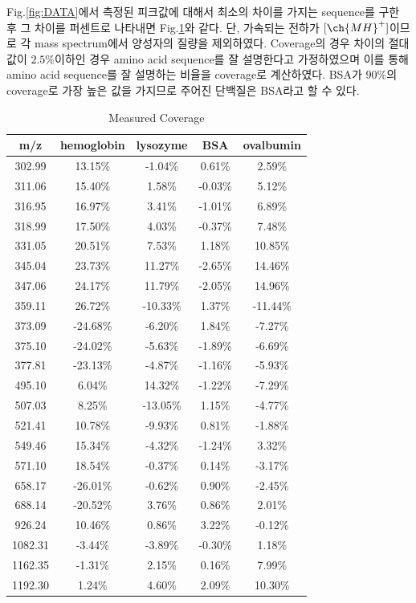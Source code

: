 \documentclass[%
 reprint,
 amsmath,amssymb,
 aps,
]{revtex4-2}
\begin{document}
Fig.\ref{fig:DATA}에서 측정된 피크값에 대해서 최소의 차이를 가지는 sequence를 구한 후 그 차이를 퍼센트로 나타내면 Fig.\ref{tab:cov}와 같다. 단, 가속되는 전하가 $[\ch{MH}^{+}]$이므로 각 mass spectrum에서 양성자의 질량을 제외하였다. Coverage의 경우 차이의 절대값이 $2.5\%$이하인 경우 amino acid sequence를 잘 설명한다고 가정하였으며 이를 통해 amino acid sequence를 잘 설명하는 비율을 coverage로 계산하였다. BSA가 $90\%$의 coverage로 가장 높은 값을 가지므로 주어진 단백질은 BSA라고 할 수 있다.

\begin{table}[]
\caption{\label{tab:cov} Measured Coverage}
\begin{tabular}{c|c|c|c|c} \hline \hline
m/z & hemoglobin & lysozyme & BSA & ovalbumin \\ \hline
302.99 & 13.15\% &-1.04\% &0.61\% &2.59\%\\
311.06 & 15.40\% &1.58\% &-0.03\% &5.12\%\\
316.95 & 16.97\% &3.41\% &-1.01\% &6.89\%\\
318.99 & 17.50\% &4.03\% &-0.37\% &7.48\%\\
331.05 & 20.51\% &7.53\% &1.18\% &10.85\%\\
345.04 & 23.73\% &11.27\% &-2.65\% &14.46\%\\
347.06 & 24.17\% &11.79\% &-2.05\% &14.96\%\\
359.11 & 26.72\% &-10.33\% &1.37\% &-11.44\%\\
373.09 & -24.68\% &-6.20\% &1.84\% &-7.27\%\\
375.10 & -24.02\% &-5.63\% &-1.89\% &-6.69\%\\
377.81 & -23.13\% &-4.87\% &-1.16\% &-5.93\%\\
495.10 & 6.04\% &14.32\% &-1.22\% &-7.29\%\\
507.03 & 8.25\% &-13.05\% &1.15\% &-4.77\%\\
521.41 & 10.78\% &-9.93\% &0.81\% &-1.88\%\\
549.46 & 15.34\% &-4.32\% &-1.24\% &3.32\%\\
571.10 & 18.54\% &-0.37\% &0.14\% &-3.17\%\\
658.17 & -26.01\% &-0.62\% &0.90\% &-2.45\%\\
688.14 & -20.52\% &3.76\% &0.86\% &2.01\%\\
926.24 & 10.46\% &0.86\% &3.22\% &-0.12\%\\
1082.31 & -3.44\% &-3.89\% &-0.30\% &1.18\%\\
1162.35 & -1.31\% &2.15\% &0.16\% &7.99\%\\
1192.30 & 1.24\% &4.60\% &2.09\% &10.30\%\\

\end{tabular}
\end{table}
\end{document}
